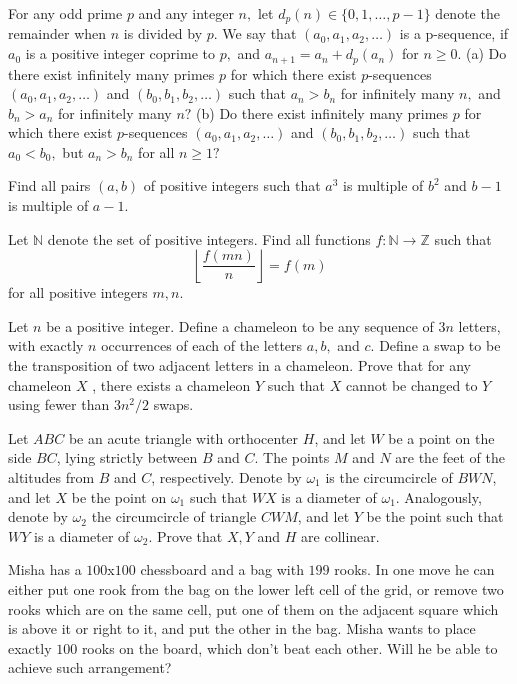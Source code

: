 \documentclass[11pt]{scrartcl}
\begin{document}
\begin{problem}[522990139281725]
	For any odd prime $p$ and any integer $n,$ let $d_p (n) \in \{ 0,1, \dots, p-1 \}$ denote the remainder when $n$ is divided by $p.$ We say that $(a_0, a_1, a_2, \dots)$ is a p-sequence, if $a_0$ is a positive integer coprime to $p,$ and $a_{n+1} =a_n + d_p (a_n)$ for $n \geqslant 0.$
(a) Do there exist infinitely many primes $p$ for which there exist $p$-sequences $(a_0, a_1, a_2, \dots)$ and $(b_0, b_1, b_2, \dots)$ such that $a_n >b_n$ for infinitely many $n,$ and $b_n > a_n$ for infinitely many $n?$
(b) Do there exist infinitely many primes $p$ for which there exist $p$-sequences $(a_0, a_1, a_2, \dots)$ and $(b_0, b_1, b_2, \dots)$ such that $a_0 <b_0,$ but $a_n >b_n$ for all $n \geqslant 1?$
\end{problem}
\begin{problem}[4330093832251809273]
Find all pairs $(a,b)$ of positive integers such that $a^3$ is multiple of $b^2$ and $b-1$ is multiple of $a-1$.
\end{problem}
\begin{problem}[5901329049595563801]
Let $\mathbb{N}$ denote the set of positive integers. Find all functions $f \colon \mathbb{N} \to \mathbb{Z}$ such that\[\left\lfloor \frac{f(mn)}{n} \right\rfloor=f(m)\]for all positive integers $m,n$.
\end{problem}
\begin{problem}[106106949450397]
Let $n$ be a positive integer. Define a chameleon to be any sequence of $3n$ letters, with exactly $n$ occurrences of each of the letters $a, b,$ and $c$. Define a swap to be the transposition of two adjacent letters in a chameleon. Prove that for any chameleon $X$ , there exists a chameleon $Y$ such that $X$ cannot be changed to $Y$ using fewer than $3n^2/2$ swaps.
\end{problem}
\begin{problem}[556895401643484982]
Let $ABC$ be an acute triangle with orthocenter $H$, and let $W$ be a point on the side $BC$, lying strictly between $B$ and $C$. The points $M$ and $N$ are the feet of the altitudes from $B$ and $C$, respectively. Denote by $\omega_1$ is the circumcircle of $BWN$, and let $X$ be the point on $\omega_1$ such that $WX$ is a diameter of $\omega_1$. Analogously, denote by $\omega_2$ the circumcircle of triangle $CWM$, and let $Y$ be the point such that $WY$ is a diameter of $\omega_2$. Prove that $X,Y$ and $H$ are collinear.
\end{problem}
\begin{problem}[614247648874042]
Misha has a $100$x$100$ chessboard and a bag with $199$ rooks. In one move he can either put one rook from the bag on the lower left cell of the grid, or remove two rooks which are on the same cell, put one of them on the adjacent square which is above it or right to it, and put the other in the bag. Misha wants to place exactly $100$ rooks on the board, which don't beat each other. Will he be able to achieve such arrangement?
\end{problem}
\end{document}
